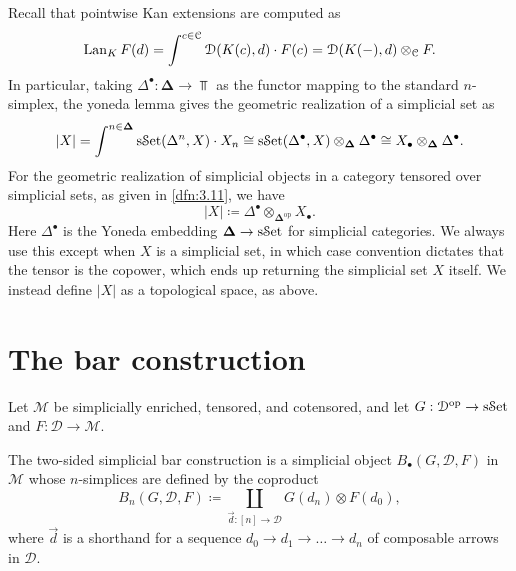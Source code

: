 Recall that pointwise Kan extensions are computed as
\[
	\operatorname{Lan}_{K} F(d)=\int^{c\in \mathcal{C} } \mathcal{D} (K(c),d)\cdot F(c)=\mathcal{D} (K(-),d)\otimes _\mathcal{C} F
.\]
In particular, taking $\Delta^{\bullet} : \boldsymbol{\Delta}  \to \Top $ as the functor mapping to the standard $n$-simplex, the yoneda lemma gives the geometric realization of a simplicial set as
\[
	\left| X \right| =\int^{n\in\boldsymbol{\Delta} } \mathrm{s}\mathcal{S}\mathrm{et}(\Delta^n,X)\cdot X_n\cong \mathrm{s}\mathcal{S}\mathrm{et}(\Delta^{\bullet} ,X)\otimes_{\boldsymbol{\Delta}} \Delta^{\bullet} \cong X_{\bullet} \otimes_{\boldsymbol{\Delta}} \Delta^{\bullet} 
.\]
For the geometric realization of simplicial objects in a category tensored over simplicial sets, as given in \cref{dfn:3.11}, we have
\[
	\left| X \right| \coloneqq \Delta^{\bullet} \otimes _{\boldsymbol{\Delta} ^{\mathrm{op}} } X_{\bullet} 
.\]
Here $\Delta^{\bullet} $ is the Yoneda embedding $\boldsymbol{\Delta} \to \mathrm{s}\mathcal{S}\mathrm{et}$ for simplicial categories. We always use this except when $X$ is a simplicial set, in which case convention dictates that the tensor is the copower, which ends up returning the simplicial set $X$ itself. We instead define $\left| X \right| $ as a topological space, as above.

\section{The bar construction}

Let $\mathcal{M} $ be simplicially enriched, tensored, and cotensored, and let $G : \mathcal{D} ^{\mathrm{op}}  \to \mathrm{s}\mathcal{S}\mathrm{et}$ and $F : \mathcal{D}  \to \mathcal{M} $.

\begin{definition}[Bar]\label{dfn:4.2}
	The two-sided simplicial bar construction is a simplicial object $B_{\bullet} (G,\mathcal{D} ,F)$ in $\mathcal{M} $ whose $n$-simplices are defined by the coproduct
	\[
		B_n(G,\mathcal{D} ,F)\coloneqq \coprod_{\vec{d} : [n] \to \mathcal{D} } G(d_n)\otimes F(d_0),
	\]
	where $\vec{d} $ is a shorthand for a sequence $d_0\to d_1\to \ldots \to d_n$ of composable arrows in $\mathcal{D} $.
\end{definition}

